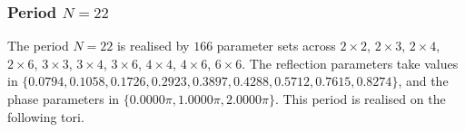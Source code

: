 \par
\subsubsection{Period $N = 22$}
The period $N=22$ is realised by $166$ parameter sets across $2\times2$, $2\times3$, $2\times4$, $2\times6$, $3\times3$, $3\times4$, $3\times6$, $4\times4$, $4\times6$, $6\times6$. The reflection parameters take values in $\{0.0794, 0.1058, 0.1726, 0.2923, 0.3897, 0.4288, 0.5712, 0.7615, 0.8274\}$, and the phase parameters in $\{0.0000\pi, 1.0000\pi, 2.0000\pi\}$. This period is realised on the following tori.
